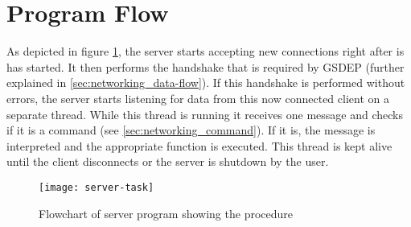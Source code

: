 \section{Program Flow}

As depicted in figure \ref{fig:server-program-flow}, the server starts accepting new connections right after is has started. It then performs the handshake that is required by GSDEP (further explained in \ref{sec:networking_data-flow}). If this handshake is performed without errors, the server starts listening for data from this now connected client on a separate thread. While this thread is running it receives one message and checks if it is a command (see \ref{sec:networking_command}). If it is, the message is interpreted and the appropriate function is executed. This thread is kept alive until the client disconnects or the server is shutdown by the user.

\begin{figure}[H]
	\centering
	\texttt{[image: server-task]}
	\caption{Flowchart of server program showing the procedure}
	\label{fig:server-program-flow}
\end{figure}
